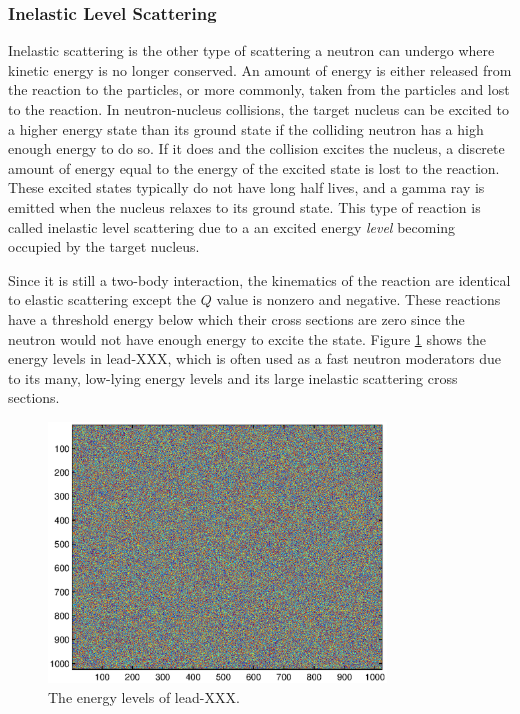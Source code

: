 \subsubsection{Inelastic Level Scattering}

Inelastic scattering is the other type of scattering a neutron can undergo where kinetic energy is no longer conserved.  An amount of energy is either released from the reaction to the particles, or more commonly, taken from the particles and lost to the reaction.  In neutron-nucleus collisions, the target nucleus can be excited to a higher energy state than its ground state if the colliding neutron has a high enough energy to do so.  If it does and the collision excites the nucleus, a discrete amount of energy equal to the energy of the excited state is lost to the reaction.  These excited states typically do not have long half lives, and a gamma ray is emitted when the nucleus relaxes to its ground state.  This type of reaction is called inelastic level scattering due to a an excited energy \emph{level} becoming occupied by the target nucleus.  

Since it is still a two-body interaction, the kinematics of the reaction are identical to elastic scattering except the $Q$ value is nonzero and negative.  These reactions have a threshold energy below which their cross sections are zero since the neutron would not have enough energy to excite the state.   Figure \ref{Elevels} shows the energy levels in lead-XXX, which is often used as a fast neutron moderators due to its many, low-lying energy levels and its large inelastic scattering cross sections.

\begin{figure}[h!]
  \centering
    \includegraphics[width=0.8\textwidth]{graphics/noise.eps}
     \caption{The energy levels of lead-XXX\cite{}. \label{Elevels}}
\end{figure}

